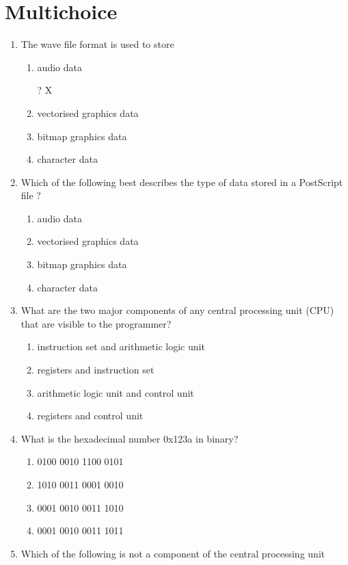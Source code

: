 \documentclass[a4paper,10pt]{article}
\begin{document}
\section{Multichoice}
\begin{enumerate}

\item The wave file format is used to store
\begin{enumerate}
  \item audio data

? X
  \item vectorised graphics data
  \item bitmap graphics data
  \item character data
\end{enumerate}

\item Which of the following best describes the type of data stored in a
PostScript file ? 
\begin{enumerate}
  \item audio data
  \item vectorised graphics data
  \item bitmap graphics data
  \item character data
\end{enumerate}

\item What are the two major components of any central processing unit
(CPU) that are visible to the programmer? 
\begin{enumerate}
  \item instruction set and arithmetic logic unit 
  \item registers and instruction set
  \item arithmetic logic unit and control unit
  \item registers and control unit
\end{enumerate}

\item What is the hexadecimal number 0x123a in binary?
\begin{enumerate}
  \item 0100 0010 1100 0101
  \item 1010 0011 0001 0010
  \item 0001 0010 0011 1010
  \item 0001 0010 0011 1011
\end{enumerate}

\newpage
\item Which of the following is not a component of the central
processing unit


\end{enumerate}
\end{document}
